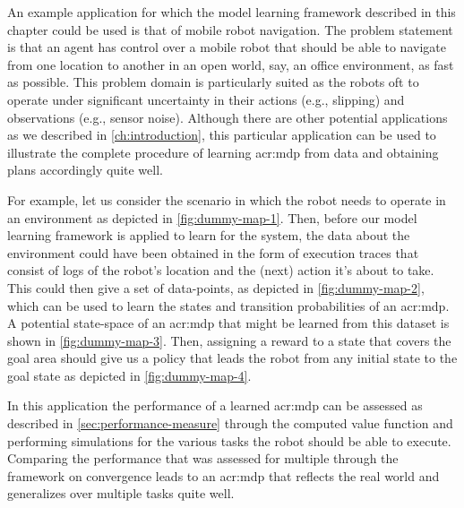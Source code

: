 
An example application for which the model learning framework described in this chapter could be used is that of mobile robot navigation.
The problem statement is that an agent has control over a mobile robot that should be able to navigate from one location to another in an open world, say, an office environment, as fast as possible.
This problem domain is particularly suited as the robots oft to operate under significant uncertainty in their actions (e.g., slipping) and observations (e.g., sensor noise).
Although there are other potential applications as we described in \autoref{ch:introduction}, this particular application can be used to illustrate the complete procedure of learning \acrshort{acr:mdp} from data and obtaining plans accordingly quite well.

For example, let us consider the scenario in which the robot needs to operate in an environment as depicted in \autoref{fig:dummy-map-1}.
Then, before our model learning framework is applied to learn  for the system, the data about the environment could have been obtained in the form of execution traces that consist of logs of the robot's location and the (next) action it's about to take.
This could then give a set of data-points, as depicted in \autoref{fig:dummy-map-2}, which can be used to learn the states and transition probabilities of an \acrshort{acr:mdp}.
A potential state-space of an \acrshort{acr:mdp} that might be learned from this dataset is shown in \autoref{fig:dummy-map-3}.
Then, assigning a reward to a state that covers the goal area should give us a policy that leads the robot from any initial state to the goal state as depicted in \autoref{fig:dummy-map-4}.

In this application the performance of a learned \acrshort{acr:mdp} can be assessed as described in \autoref{sec:performance-measure} through the computed value function and performing simulations for the various tasks the robot should be able to execute.
Comparing the performance that was assessed for multiple  through the framework on convergence leads to an \acrshort{acr:mdp} that reflects the real world and generalizes over multiple tasks quite well.

